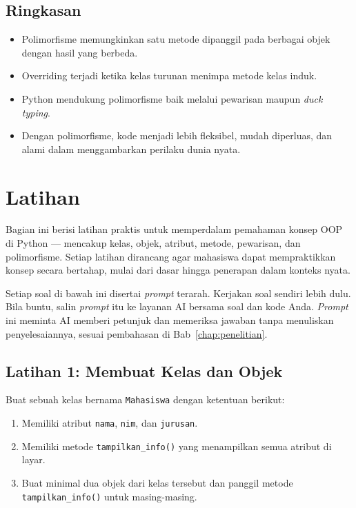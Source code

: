 \subsection*{Ringkasan}
\begin{itemize}
    \item Polimorfisme memungkinkan satu metode dipanggil pada berbagai objek dengan hasil yang berbeda.
    \item Overriding terjadi ketika kelas turunan menimpa metode kelas induk.
    \item Python mendukung polimorfisme baik melalui pewarisan maupun \emph{duck typing}.
    \item Dengan polimorfisme, kode menjadi lebih fleksibel, mudah diperluas, dan alami dalam menggambarkan perilaku dunia nyata.
\end{itemize}

\section{Latihan}

Bagian ini berisi latihan praktis untuk memperdalam pemahaman konsep OOP di Python — mencakup kelas, objek, atribut, metode, pewarisan, dan polimorfisme.  
Setiap latihan dirancang agar mahasiswa dapat mempraktikkan konsep secara bertahap, mulai dari dasar hingga penerapan dalam konteks nyata.

Setiap soal di bawah ini disertai \textit{prompt} terarah. Kerjakan soal sendiri lebih dulu. Bila buntu, salin \textit{prompt} itu ke layanan AI bersama soal dan kode Anda. \textit{Prompt} ini meminta AI memberi petunjuk dan memeriksa jawaban tanpa menuliskan penyelesaiannya, sesuai pembahasan di Bab~\ref{chap:penelitian}.

\subsection*{Latihan 1: Membuat Kelas dan Objek}
Buat sebuah kelas bernama \texttt{Mahasiswa} dengan ketentuan berikut:
\begin{enumerate}
    \item Memiliki atribut \texttt{nama}, \texttt{nim}, dan \texttt{jurusan}.
    \item Memiliki metode \texttt{tampilkan\_info()} yang menampilkan semua atribut di layar.
    \item Buat minimal dua objek dari kelas tersebut dan panggil metode \texttt{tampilkan\_info()} untuk masing-masing.
\end{enumerate}

